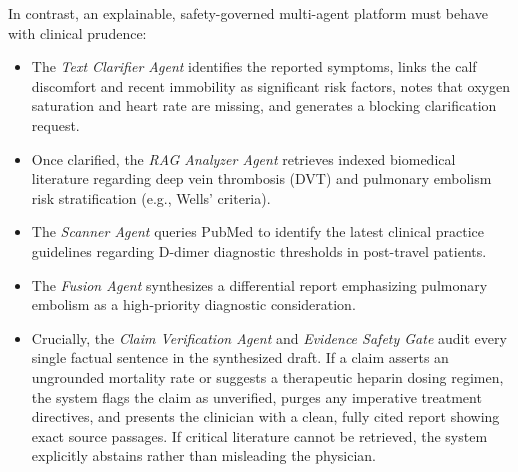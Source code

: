 \documentclass[12pt,a4paper]{report}
\begin{document}
In contrast, an explainable, safety-governed multi-agent platform must behave with clinical prudence:
\begin{itemize}
    \item The \textit{Text Clarifier Agent} identifies the reported symptoms, links the calf discomfort and recent immobility as significant risk factors, notes that oxygen saturation and heart rate are missing, and generates a blocking clarification request.
    \item Once clarified, the \textit{RAG Analyzer Agent} retrieves indexed biomedical literature regarding deep vein thrombosis (DVT) and pulmonary embolism risk stratification (e.g., Wells' criteria).
    \item The \textit{Scanner Agent} queries PubMed to identify the latest clinical practice guidelines regarding D-dimer diagnostic thresholds in post-travel patients.
    \item The \textit{Fusion Agent} synthesizes a differential report emphasizing pulmonary embolism as a high-priority diagnostic consideration.
    \item Crucially, the \textit{Claim Verification Agent} and \textit{Evidence Safety Gate} audit every single factual sentence in the synthesized draft. If a claim asserts an ungrounded mortality rate or suggests a therapeutic heparin dosing regimen, the system flags the claim as unverified, purges any imperative treatment directives, and presents the clinician with a clean, fully cited report showing exact source passages. If critical literature cannot be retrieved, the system explicitly abstains rather than misleading the physician.
\end{itemize}
\end{document}
